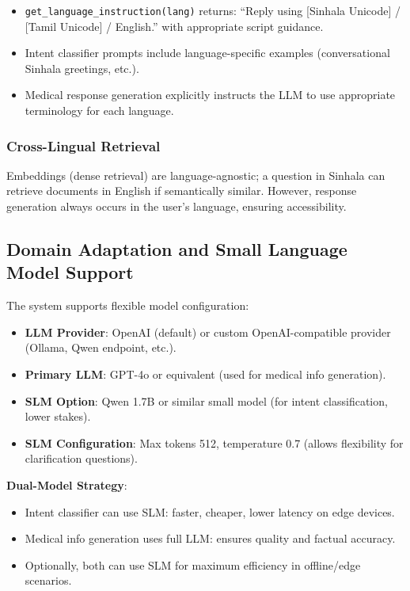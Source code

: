 \documentclass[11pt,a4paper]{article}
\begin{document}
\begin{itemize}
    \item \texttt{get\_language\_instruction(lang)} returns: ``Reply using [Sinhala Unicode] / [Tamil Unicode] / English.'' with appropriate script guidance.
    \item Intent classifier prompts include language-specific examples (conversational Sinhala greetings, etc.).
    \item Medical response generation explicitly instructs the LLM to use appropriate terminology for each language.
\end{itemize}

\subsubsection{Cross-Lingual Retrieval}
Embeddings (dense retrieval) are language-agnostic; a question in Sinhala can retrieve documents in English if semantically similar. However, response generation always occurs in the user's language, ensuring accessibility.

\subsection{Domain Adaptation and Small Language Model Support}
\label{sec:domain-adaptation}

The system supports flexible model configuration:

\begin{itemize}
    \item \textbf{LLM Provider}: OpenAI (default) or custom OpenAI-compatible provider (Ollama, Qwen endpoint, etc.).
    \item \textbf{Primary LLM}: GPT-4o or equivalent (used for medical info generation).
    \item \textbf{SLM Option}: Qwen 1.7B or similar small model (for intent classification, lower stakes).
    \item \textbf{SLM Configuration}: Max tokens 512, temperature 0.7 (allows flexibility for clarification questions).
\end{itemize}

\textbf{Dual-Model Strategy}:
\begin{itemize}
    \item Intent classifier can use SLM: faster, cheaper, lower latency on edge devices.
    \item Medical info generation uses full LLM: ensures quality and factual accuracy.
    \item Optionally, both can use SLM for maximum efficiency in offline/edge scenarios.
\end{itemize}
\end{document}
